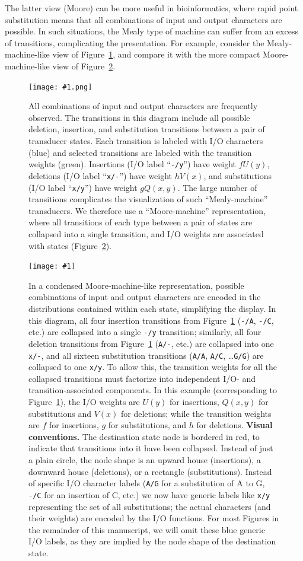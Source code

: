 \documentclass{article}
\newcommand{\figref}[1]{Figure~\ref{Figures.#1}}
\newcommand{\figlabel}[1]{\label{Figures.#1}}
\newcommand{\easyfig}[4]{
\begin{figure}
\texttt{[image: \#1]}
\caption{ \figlabel{#3} #4}
\end{figure}}
\newcommand{\widepngfig}[2]{\easyfig{#1.png}{width=\textwidth}{#1}{#2}}
\newcommand{\sidewayspngfig}[2]{
\begin{figure}
\texttt{[image: \#1.png]}
\caption{\figlabel{#1} #2}
\end{figure}
}
\begin{document}
The latter view (Moore) can be more useful in bioinformatics,
where rapid point substitution means that all combinations of input and output characters 
are possible.  
In such situations, the Mealy type of machine can suffer from an excess of transitions, complicating the presentation.  
For example, consider the Mealy-machine-like view of  \figref{fanned-emission},
and compare it with the more compact Moore-machine-like view of \figref{condensed-emission}.  

\sidewayspngfig{fanned-emission}{All combinations of input and output characters are frequently observed.  
The transitions in this diagram include all possible deletion, insertion, and substitution transitions between a pair of transducer states.
Each transition is labeled with I/O characters (blue) and selected transitions are labeled with the transition weights (green).
Insertions (I/O label ``{\tt -/y}'') have weight $fU(y)$,
deletions (I/O label ``{\tt x/-}'') have weight $hV(x)$,
and substitutions (I/O label ``{\tt x/y}'') have weight $gQ(x,y)$.
The large number of transitions complicates the visualization of such ``Mealy-machine'' transducers.
We therefore use a ``Moore-machine'' representation, where all transitions of each type between a pair of states
are collapsed into a single transition, and I/O weights are associated with states (\figref{condensed-emission}).
}

\widepngfig{condensed-emission}
{In a condensed Moore-machine-like representation, possible combinations of input and output characters are encoded in the distributions contained within each state,
simplifying the display.  
In this diagram, all four insertion transitions from \figref{fanned-emission} ({\tt -/A}, {\tt -/C}, etc.) are collapsed into a single {\tt -/y} transition;
similarly, all four deletion transitions from \figref{fanned-emission} ({\tt A/-}, etc.) are collapsed into one {\tt x/-},
and all sixteen substitution transitions ({\tt A/A}, {\tt A/C}, \ldots {\tt G/G}) are collapsed to one {\tt x/y}.
To allow this, the transition weights for all the collapsed transitions must factorize into independent I/O- and transition-associated components.
In this example (corresponding to \figref{fanned-emission}), the I/O weights are $U(y)$ for insertions, $Q(x,y)$ for substitutions and $V(x)$ for deletions;
while the transition weights are $f$ for insertions, $g$ for substitutions, and $h$ for deletions.
{\bf Visual conventions.}
The destination state node is bordered in red, to indicate that transitions into it have been collapsed.
Instead of just a plain circle, the node shape is an upward house (insertions), a downward house (deletions), or a rectangle (substitutions).
Instead of specific I/O character labels ({\tt A/G} for a substitution of A to G, {\tt -/C} for an insertion of C, etc.)
we now have generic labels like {\tt x/y} representing the set of all substitutions; the actual characters (and their weights) are encoded by the I/O functions.
For most Figures in the remainder of this manuscript, we will omit these blue generic I/O labels,
as they are implied by the node shape of the destination state.}
\end{document}
